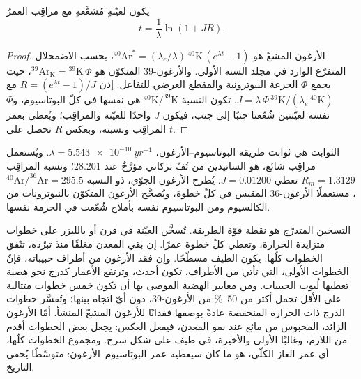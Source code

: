 \begin{theorem}\label{thm:b3:advanced-geochronology:arar}
يكون لعيّنةٍ مُشعَّعةٍ مع مراقِب العمرُ
\[
t = \frac1\lambda\ln(1 + JR).
\]
\end{theorem}

\begin{proof}
الأرغون المشعّ هو $^{40}\mathrm{Ar}^* = (\lambda_e/\lambda)\,
{}^{40}\mathrm{K}\,(e^{\lambda t} - 1)$، بحسب الاضمحلال المتفرّع الوارد في
مجلد السنة الأولى. والأرغون-39 المتكوّن هو $^{39}\mathrm{Ar}_{\mathrm K} =
{}^{39}\mathrm{K}\,\Phi$، حيث يجمع $\Phi$ الجرعة النيوترونية
والمقطع العرضي للتفاعل. إذن $R = (e^{\lambda t} - 1)/J$ مع $J =
\lambda\,\Phi\,{}^{39}\mathrm{K}/(\lambda_e\,{}^{40}\mathrm{K})$. تكون النسبة
$^{40}\mathrm{K}/^{39}\mathrm{K}$ هي نفسها في كلّ البوتاسيوم، و$\Phi$ نفسه
لعيّنتين شُعّعتا جنبًا إلى جنب، فيكون $J$ واحدًا للعيّنة
والمراقِب؛ ويُعطى بعمر المراقِب ونسبته، وبعكس $R$ نحصل على
$t$.
\end{proof}

الثوابت هي ثوابت طريقة البوتاسيوم--الأرغون، $\lambda =
\qty{5.543e-10}{yr^{-1}}$. ويُستعمل مراقِب شائع، هو السانيدين من تُفّ بركاني
مؤرَّخٌ عند \qty{28.201}{\Ma}؛ ونسبة المراقِب $R_m = 1.3129$ تعطي $J =
0.01200$. يُطرح الأرغون الجوّي، ذو النسبة $^{40}\mathrm{Ar}/^{36}\mathrm{Ar} = 295.5$،
مستعملًا الأرغون-36 المقيس في كلّ خطوة، ويُصحَّح الأرغون المتكوّن بالنيوترونات
من الكالسيوم ومن البوتاسيوم نفسه بأملاح شُعّعت
في الحزمة نفسها.

التسخين المتدرّج هو نقطة قوّة الطريقة. تُسخَّن العيّنة في فرن
أو بالليزر على خطوات متزايدة الحرارة، وتعطي كلّ خطوة عمرًا.
إن بقي المعدن مغلقًا منذ تبرّده، تتّفق الخطوات كلّها: يكون الطيف
مسطّحًا. وإن فقد الأرغون من أطراف حبيباته، فإنّ الخطوات الأولى، التي
تأتي من الأطراف، تكون أحدث، وترتفع الأعمار كدرج نحو
هضبة تعطيها لُبوب الحبيبات. ومن معايير الهضبة الموصى بها أن تكون
خمس خطوات متتالية على الأقل تحمل أكثر من \qty{50}{\percent} من
الأرغون-39، دون أيّ اتجاه بينها؛ وتُفسَّر خطوات الدرج ذات الحرارة المنخفضة
عادةً بوصفها فقدانًا للأرغون المشعّ المنشأ. أمّا الأرغون الزائد، المحبوس من
مائع عند نمو المعدن، فيفعل العكس: يجعل بعض الخطوات أقدم من اللازم،
وغالبًا الأولى والأخيرة، في طيف على شكل سرج. ومجموع الخطوات كلّها،
أي عمر الغاز الكلّي، هو ما كان سيعطيه عمر البوتاسيوم--الأرغون: متوسّطًا
يُخفي التاريخ.

